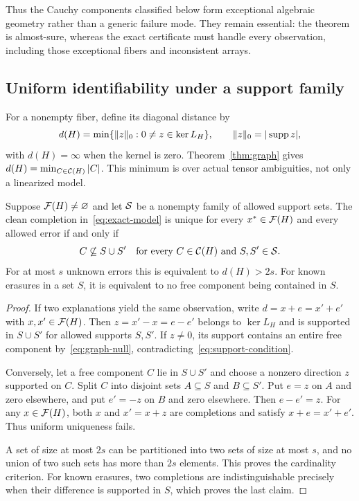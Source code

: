 Thus the Cauchy components classified below form exceptional algebraic geometry rather than a generic failure mode.  They remain essential: the theorem is almost-sure, whereas the exact certificate must handle every observation, including those exceptional fibers and inconsistent arrays.

\subsection{Uniform identifiability under a support family}
For a nonempty fiber, define its diagonal distance by
\begin{equation}\label{eq:distance}
 d(H)=\min\{\lVert z\rVert_0:0\ne z\in\ker L_H\},
 \qquad \lVert z\rVert_0=|\operatorname{supp} z|,
\end{equation}
with $d(H)=\infty$ when the kernel is zero. Theorem~\ref{thm:graph} gives $d(H)=\min_{C\in\mathcal C(H)}|C|$. This minimum is over actual tensor ambiguities, not only a linearized model.

\begin{theorem}\label{thm:correction}
Suppose $\mathcal F(H)\ne\varnothing$ and let $\mathcal S$ be a nonempty family of allowed support sets. The clean completion in~\eqref{eq:exact-model} is unique for every $x^*\in\mathcal F(H)$ and every allowed error if and only if
\begin{equation}\label{eq:support-condition}
 C\not\subseteq S\cup S'
 \quad\text{for every }C\in\mathcal C(H)\text{ and }S,S'\in\mathcal S.
\end{equation}
For at most $s$ unknown errors this is equivalent to $d(H)>2s$. For known erasures in a set $S$, it is equivalent to no free component being contained in $S$.
\end{theorem}
\begin{proof}
If two explanations yield the same observation, write $d=x+e=x'+e'$ with $x,x'\in\mathcal F(H)$. Then $z=x'-x=e-e'$ belongs to $\ker L_H$ and is supported in $S\cup S'$ for allowed supports $S,S'$. If $z\ne0$, its support contains an entire free component by~\eqref{eq:graph-null}, contradicting~\eqref{eq:support-condition}.

Conversely, let a free component $C$ lie in $S\cup S'$ and choose a nonzero direction $z$ supported on $C$. Split $C$ into disjoint sets $A\subseteq S$ and $B\subseteq S'$. Put $e=z$ on $A$ and zero elsewhere, and put $e'=-z$ on $B$ and zero elsewhere. Then $e-e'=z$. For any $x\in\mathcal F(H)$, both $x$ and $x'=x+z$ are completions and satisfy $x+e=x'+e'$. Thus uniform uniqueness fails.

A set of size at most $2s$ can be partitioned into two sets of size at most $s$, and no union of two such sets has more than $2s$ elements. This proves the cardinality criterion. For known erasures, two completions are indistinguishable precisely when their difference is supported in $S$, which proves the last claim.
\end{proof}

